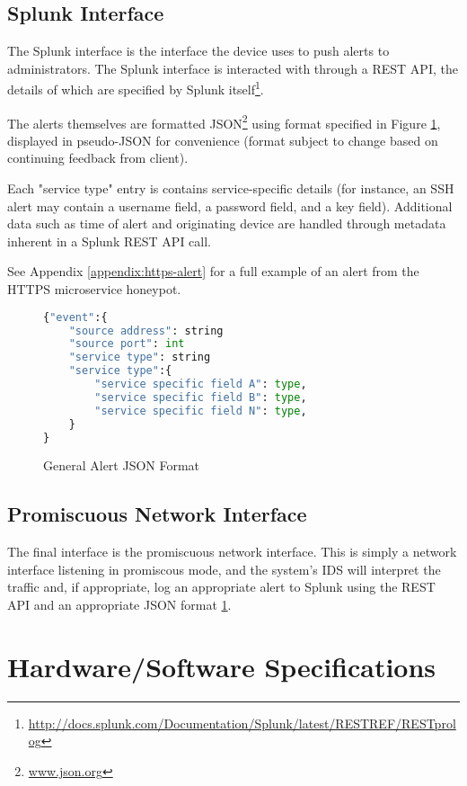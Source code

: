 \subsection{Splunk Interface}

The Splunk interface is the interface the device uses to push alerts to
administrators. The Splunk interface is interacted with through a
REST API, the details of which are specified by Splunk itself\footnote{\url{http://docs.splunk.com/Documentation/Splunk/latest/RESTREF/RESTprolog}}.

The alerts themselves are formatted JSON\footnote{\url{www.json.org}} using
format specified in Figure \ref{figure:alert-format}, displayed in pseudo-JSON
for convenience (format subject to change based on continuing feedback from
client).

Each "service type" entry is contains service-specific details (for instance,
an SSH alert may contain a username field, a password field, and a key field).
Additional data such as time of alert and originating device are handled
through metadata inherent in a Splunk REST API call.

See Appendix \ref{appendix:https-alert} for a full example of an alert from
the HTTPS microservice honeypot.

\begin{figure}
\begin{lstlisting}[language=Python,frame=single,showstringspaces=false]
{"event":{
    "source address": string
    "source port": int
    "service type": string
    "service type":{
        "service specific field A": type,
        "service specific field B": type,
        "service specific field N": type,
    }
}
\end{lstlisting}
\caption{General Alert JSON Format}
\label{figure:alert-format}
\end{figure}

\subsection{Promiscuous Network Interface}

The final interface is the promiscuous network interface. This is simply
a network interface listening in promiscous mode, and the system's IDS
will interpret the traffic and, if appropriate, log an appropriate alert
to Splunk using the REST API and an appropriate JSON format
\ref{figure:alert-format}.

\section{Hardware/Software Specifications}

